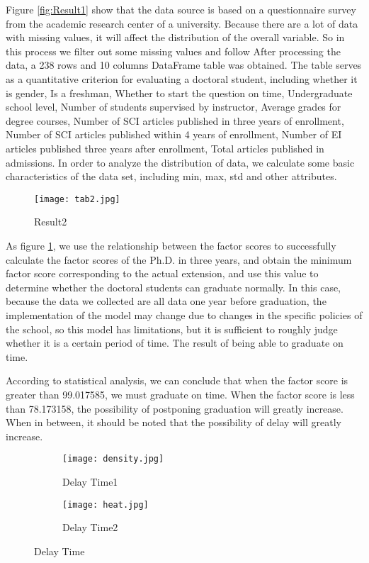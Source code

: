 \documentclass{mcmthesis}
\begin{document}
Figure \ref{fig:Result1} show that the data source is based on a questionnaire
survey from the academic research center of a university. Because there are a
lot of data with missing values, it will affect the distribution of the overall
variable. So in this process we filter out some missing values and follow After
processing the data, a 238 rows and 10 columns DataFrame table was obtained. The
table serves as a quantitative criterion for evaluating a doctoral student,
including whether it is gender, Is a freshman, Whether to start the question on
time, Undergraduate school level, Number of students supervised by instructor,
Average grades for degree courses, Number of SCI articles published in three
years of enrollment, Number of SCI articles published within 4 years of
enrollment, Number of EI articles published three years after enrollment, Total
articles published in admissions. In order to analyze the distribution of data,
we calculate some basic characteristics of the data set, including min, max, std
and other attributes.

\begin{figure}[htbp]
	\centering
	\texttt{[image: tab2.jpg]}
	\caption{Result2}
	\label{fig:Result2}
\end{figure}

As figure \ref{fig:Result2}, we use the relationship between the factor
scores to successfully calculate the factor scores of the Ph.D. in three years,
and obtain the minimum factor score corresponding to the actual extension, and
use this value to determine whether the doctoral students can graduate normally.
In this case, because the data we collected are all data one year before
graduation, the implementation of the model may change due to changes in the
specific policies of the school, so this model has limitations, but it is
sufficient to roughly judge whether it is a certain period of time. The result
of being able to graduate on time.

According to statistical analysis, we can conclude that when the factor score is
greater than 99.017585, we must graduate on time. When the factor score is less
than 78.173158, the possibility of postponing graduation will greatly increase.
When in between, it should be noted that the possibility of delay will greatly
increase.

\begin{figure}[htbp]
	\centering
	\begin{subfigure}[htbp]{.45\linewidth}
		\centering
		\texttt{[image: density.jpg]}
		\caption{Delay Time1}
		\label{fig:Delay Time1}
	\end{subfigure}
	\quad
	\begin{subfigure}[htbp]{.45\linewidth}
		\centering
		\texttt{[image: heat.jpg]}
		\caption{Delay Time2}
		\label{fig:Delay Time2}
	\end{subfigure}
	\caption{Delay Time}
	\label{fig:Delay Time}
\end{figure}
\end{document}
